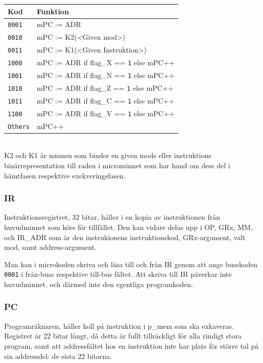 \documentclass[]{article}
\begin{document}
\begin{tabular}{ll}
	\textbf{Kod}    & \textbf{Funktion}                              \\ \hline
	\texttt{0001}   & mPC := ADR                                     \\
	\texttt{0010}   & mPC := K2(<Given mod>)                         \\
	\texttt{0011}   & mPC := K1(<Given Instruktion>)                 \\
	\texttt{1000}   & mPC := ADR if flag\_X == \texttt{1} else mPC++ \\
	\texttt{1001}   & mPC := ADR if flag\_N == \texttt{1} else mPC++ \\
	\texttt{1010}   & mPC := ADR if flag\_Z == \texttt{1} else mPC++ \\
	\texttt{1011}   & mPC := ADR if flag\_C == \texttt{1} else mPC++ \\
	\texttt{1100}   & mPC := ADR if flag\_V == \texttt{1} else mPC++ \\
	\texttt{Others} & mPC++
\end{tabular}
\\

\noindent
K2 och K1 är minnen som binder en given mods eller instruktions binärrepresentation till raden i microminnet som har hand om dess del i hämtfasen respektive exekveringsfasen.

\subsubsection{IR}

Instruktionsregistret, 32 bitar, håller i en kopia av instruktionen från huvudminnet som körs för tillfället. Den kan vidare delas upp i OP, GRx, MM, och IR\_ADR som är den instrukionens instruktionskod, GRx-argument, valt mod, samt address-argument.

Man kan i microkoden skriva och läsa till och från IR genom att ange busskoden \texttt{0001} i från-buss respektive till-bus fältet. Att skriva till IR påverkar inte huvudminnet, och därmed inte den egentliga programkoden.

\subsubsection{PC}

Programräknaren, håller koll på instruktion i p\_mem som ska exkaveras. Registret är 22 bitar långt, då detta är fullt tillräckligt för alla rimligt stora program, samt att addressfältet hos en instruktion inte har plats för större tal på sin addressdel: de sista 22 bitarna.
\end{document}
